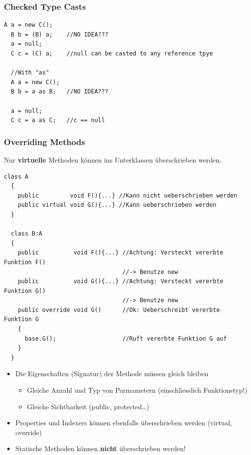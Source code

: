 \subsubsection{Checked Type Casts}
\begin{lstlisting}[style=C]
  A a = new C(); 
  B b = (B) a;    //NO IDEA???
  a = null; 
  C c = (C) a;    //null can be casted to any reference tpye
  
  //With "as"
  A a = new C();  
  B b = a as B;   //NO IDEA???
  
  a = null; 
  C c = a as C;   //c == null
\end{lstlisting}

\subsubsection{Overriding Methods}
Nur \textbf{virtuelle} Methoden können ins Unterklassen überschrieben werden. 
\begin{lstlisting}[style=C]
  class A
  {
    public         void F(){...} //Kann nicht ueberschrieben werden 
    public virtual void G(){...} //Kann ueberschrieben werden
  }
  
  class B:A
  {
    public          void F(){...} //Achtung: Versteckt vererbte Funktion F()
                                  //-> Benutze new
    public          void G(){...} //Achtung: Versteckt vererbte Funktion G()
                                  //-> Benutze new
    public override void G()      //Ok: Ueberschreibt vererbte Funktion G
    {
      base.G();                   //Ruft vererbte Funktion G auf
    }
  }
\end{lstlisting}
\begin{itemize}
  \item Die Eigenschaften (Signatur) der Methode müssen gleich bleiben 
  \begin {itemize}
    \item Gleiche Anzahl und Typ von Parmametern (einschliesslich Funktionstyp!)
    \item Gleiche Sichtbarkeit (public, protected\ldots)
  \end{itemize}
  \item Properties und Indexers können ebenfalls überschrieben werden (virtual,
  override)
  \item Statische Methoden können \textbf{nicht} überschrieben werden!
\end{itemize}

